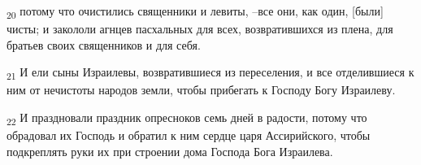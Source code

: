 \begin{tcolorbox}
\textsubscript{20} потому что очистились священники и левиты, --все они, как один, [были] чисты; и закололи агнцев пасхальных для всех, возвратившихся из плена, для братьев своих священников и для себя.
\end{tcolorbox}
\begin{tcolorbox}
\textsubscript{21} И ели сыны Израилевы, возвратившиеся из переселения, и все отделившиеся к ним от нечистоты народов земли, чтобы прибегать к Господу Богу Израилеву.
\end{tcolorbox}
\begin{tcolorbox}
\textsubscript{22} И праздновали праздник опресноков семь дней в радости, потому что обрадовал их Господь и обратил к ним сердце царя Ассирийского, чтобы подкреплять руки их при строении дома Господа Бога Израилева.
\end{tcolorbox}
